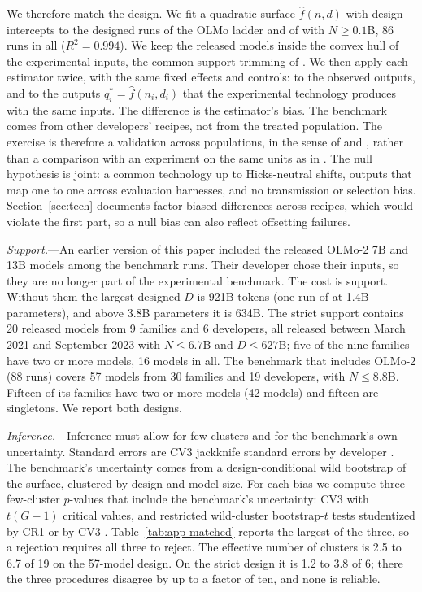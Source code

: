 We therefore match the design. We fit a quadratic surface $\hat f(n,d)$ with design intercepts to the designed runs of
the OLMo ladder \citep{bhagia2024establishing} and of \citet{gadre2024language} with $N\geq0.1$B, 86 runs in all
($R^2=0.994$). We keep the released models inside the convex hull of the experimental inputs, the common-support
trimming of \citet{dehejia1999causal}. We then apply each estimator twice, with the same fixed effects and controls: to
the observed outputs, and to the outputs $q^*_i=\hat f(n_i,d_i)$ that the experimental technology produces with the
same inputs. The difference is the estimator's bias. The benchmark comes from other developers' recipes, not from the
treated population. The exercise is therefore a validation across populations, in the sense of
\citet{todd2006assessing} and \citet{hotz2005predicting}, rather than a comparison with an experiment on the same units
as in \citet{lalonde1986evaluating}. The null hypothesis is joint: a common technology up to Hicks-neutral shifts,
outputs that map one to one across evaluation harnesses, and no transmission or selection bias. Section~\ref{sec:tech} documents factor-biased differences across
recipes, which would violate the first part, so a null bias can also reflect offsetting failures.

\emph{Support.}---An earlier version of this paper included the released OLMo-2 7B and 13B models
\citep{teamolmo2024olmo} among the benchmark runs. Their developer chose their inputs, so they are no longer part of the
experimental benchmark. The cost is support. Without them the largest designed $D$ is 921B tokens (one run of
\citealp{gadre2024language} at 1.4B parameters), and above 3.8B parameters it is 634B. The strict support contains
20 released models from 9 families and 6 developers, all released between March 2021 and September 2023 with
$N\le6.7$B and $D\le627$B; five of the nine families have two or more models, 16 models in all. The benchmark that
includes OLMo-2 (88 runs) covers 57 models from 30 families and 19 developers, with $N\le8.8$B. Fifteen of its families
have two or more models (42 models) and fifteen are singletons. We report both designs.

\emph{Inference.}---Inference must allow for few clusters and for the benchmark's own uncertainty. Standard errors are
CV3 jackknife standard errors by developer \citep{mackinnon2023cluster}. The benchmark's uncertainty comes from a
design-conditional wild bootstrap of the surface, clustered by design and model size. For each bias we compute three
few-cluster $p$-values that include the benchmark's uncertainty: CV3 with $t(G-1)$ critical values, and restricted
wild-cluster bootstrap-$t$ tests studentized by CR1 or by CV3
\citep{cameron2008bootstrap,webb2023reworking}. Table~\ref{tab:app-matched} reports the largest of the three, so a
rejection requires all three to reject. The effective number of clusters \citep{carter2017asymptotic} is 2.5 to 6.7 of
19 on the 57-model design. On the strict design it is 1.2 to 3.8 of 6; there the three procedures disagree by up to a
factor of ten, and none is reliable.

